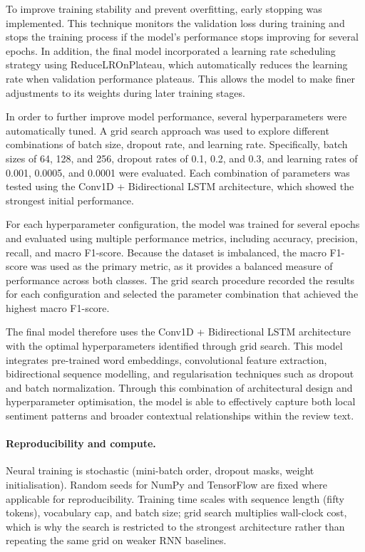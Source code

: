 \documentclass[12pt,a4paper]{article}
\begin{document}
To improve training stability and prevent overfitting, early stopping was implemented. This technique monitors the validation loss during training and stops the training process if the model's performance stops improving for several epochs. In addition, the final model incorporated a learning rate scheduling strategy using ReduceLROnPlateau, which automatically reduces the learning rate when validation performance plateaus. This allows the model to make finer adjustments to its weights during later training stages.

In order to further improve model performance, several hyperparameters were automatically tuned. A grid search approach was used to explore different combinations of batch size, dropout rate, and learning rate. Specifically, batch sizes of 64, 128, and 256, dropout rates of 0.1, 0.2, and 0.3, and learning rates of 0.001, 0.0005, and 0.0001 were evaluated. Each combination of parameters was tested using the Conv1D + Bidirectional LSTM architecture, which showed the strongest initial performance.

For each hyperparameter configuration, the model was trained for several epochs and evaluated using multiple performance metrics, including accuracy, precision, recall, and macro F1-score. Because the dataset is imbalanced, the macro F1-score was used as the primary metric, as it provides a balanced measure of performance across both classes. The grid search procedure recorded the results for each configuration and selected the parameter combination that achieved the highest macro F1-score.

The final model therefore uses the Conv1D + Bidirectional LSTM architecture with the optimal hyperparameters identified through grid search. This model integrates pre-trained word embeddings, convolutional feature extraction, bidirectional sequence modelling, and regularisation techniques such as dropout and batch normalization. Through this combination of architectural design and hyperparameter optimisation, the model is able to effectively capture both local sentiment patterns and broader contextual relationships within the review text.

\paragraph{Reproducibility and compute.}
Neural training is stochastic (mini-batch order, dropout masks, weight initialisation). Random seeds for NumPy and TensorFlow are fixed where applicable for reproducibility. Training time scales with sequence length (fifty tokens), vocabulary cap, and batch size; grid search multiplies wall-clock cost, which is why the search is restricted to the strongest architecture rather than repeating the same grid on weaker RNN baselines.
\end{document}
